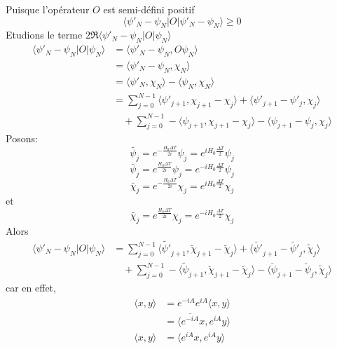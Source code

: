 Puisque l'opérateur $O$ est semi-défini positif
$$
\langle \psi'_N-\psi_N |O|\psi'_N-\psi_N \rangle \geq 0
$$ 
Etudions le terme $2\Re \langle \psi'_N-\psi_N |O|\psi_N \rangle$
\begin{align*}
\langle \psi'_N-\psi_N |O|\psi_N \rangle 
&= \langle \psi'_N-\psi_N , O\psi_N \rangle\\
&= \langle \psi'_N-\psi_N , \chi_N \rangle\\
&= \langle \psi'_N , \chi_N \rangle - \langle \psi_N , \chi_N \rangle\\
&=\sum_{j=0}^{N-1} \langle \psi'_{j+1}, \chi_{j+1} - \chi_{j} \rangle + \langle \psi'_{j+1}-\psi'_{j}, \chi_{j} \rangle\\
&\quad + \sum_{j=0}^{N-1} -\langle \psi_{j+1},\chi_{j+1}- \chi_{j} \rangle -\langle \psi_{j+1}-\psi_{j}, \chi_{j} \rangle
\end{align*}
Posons:
\begin{equation}
\tilde{\psi_j} = e^{-\frac{H_0 \Delta T}{2i}} \psi_j=e^{iH_0 \frac{\Delta T}{2}} \psi_j
\end{equation}
\begin{equation}
\breve{\psi_j} =e^{\frac{H_0 \Delta T}{2i}} \psi_j= e^{-iH_0 \frac{\Delta T}{2}} \psi_j
\end{equation}
\begin{equation}
\breve{\chi_j} =e^{-\frac{H_0 \Delta T}{2i}}\chi_j= e^{iH_0 \frac{\Delta T}{2}} \chi_j
\end{equation}
et
\begin{equation}
\tilde{\chi_j} = e^{\frac{H_0 \Delta T}{2i}}\chi_j= e^{-iH_0 \frac{\Delta T}{2}} \chi_j
\end{equation}
Alors
\begin{align*}
\langle \psi'_N-\psi_N |O|\psi_N \rangle
&=\sum_{j=0}^{N-1} \langle \tilde{\psi'}_{j+1}, \breve{\chi}_{j+1} - \breve{\chi}_{j} \rangle + \langle \breve{\psi'}_{j+1} - \breve{\psi'}_{j}, \tilde{\chi}_{j} \rangle\\
&\quad + \sum_{j=0}^{N-1} -\langle \tilde{\psi}_{j+1},\breve{\chi}_{j+1} - \breve{\chi}_{j} \rangle -\langle \breve{\psi}_{j+1} - \breve{\psi}_{j}, \tilde{\chi}_{j} \rangle
\end{align*}
car en effet,
\begin{align*}
\langle x,y \rangle &= e^{-iA}e^{iA}\langle x,y \rangle\\
&= \langle \overline{e^{-iA}}x,e^{iA}y \rangle\\
\langle x,y \rangle &= \langle e^{iA}x,e^{iA}y \rangle
\end{align*}
